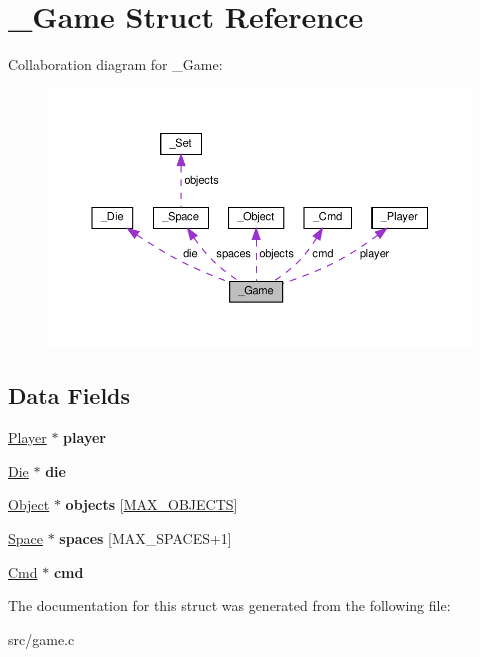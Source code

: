 \hypertarget{struct__Game}{}\section{\+\_\+\+Game Struct Reference}
\label{struct__Game}


Collaboration diagram for \+\_\+\+Game\+:\nopagebreak
\begin{figure}[H]
\begin{center}
\leavevmode
\includegraphics[width=350pt]{struct__Game__coll__graph}
\end{center}
\end{figure}
\subsection*{Data Fields}
\begin{DoxyCompactItemize}
\item 
\mbox{\label{struct__Game_a31406605782d71ec00c4bf258ea76267}} 
\hyperlink{struct__Player}{Player} $\ast$ {\bfseries player}
\item 
\mbox{\label{struct__Game_a0d6009b5dcb080489c192a9198fa7d46}} 
\hyperlink{die_8h_a892f0b0bf81d69a1f7a14ea238e36dd3}{Die} $\ast$ {\bfseries die}
\item 
\mbox{\label{struct__Game_ad45bf5645a26e546d0060a2e61f9cf81}} 
\hyperlink{object_8h_a7f8bbcda919b65ce67f92fba08e0212f}{Object} $\ast$ {\bfseries objects} \mbox{[}\hyperlink{object_8h_acdc7844fbd4d45737d4aa56834d37829}{M\+A\+X\+\_\+\+O\+B\+J\+E\+C\+TS}\mbox{]}
\item 
\mbox{\label{struct__Game_ab4180417d9148f8abb2233ca6c4ecfe5}} 
\hyperlink{struct__Space}{Space} $\ast$ {\bfseries spaces} \mbox{[}M\+A\+X\+\_\+\+S\+P\+A\+C\+ES+1\mbox{]}
\item 
\mbox{\label{struct__Game_ac98c89af82c9ffde3f17e7f4929bb97c}} 
\hyperlink{struct__Cmd}{Cmd} $\ast$ {\bfseries cmd}
\end{DoxyCompactItemize}


The documentation for this struct was generated from the following file\+:\begin{DoxyCompactItemize}
\item 
src/game.\+c\end{DoxyCompactItemize}
